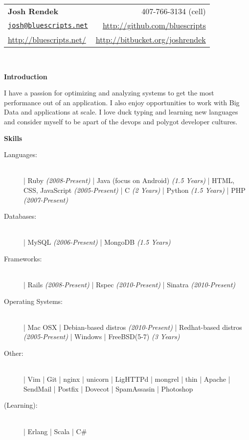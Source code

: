 \documentclass[letterpaper,11pt]{article}
\newcommand{\resheading}[1]{{\large \colorbox{myblue}{\begin{minipage}{\textwidth}{\textbf{#1 \vphantom{p\^{E}}}}\end{minipage}}}}
\begin{document}
\newcommand{\infoheader}{
\begin{tabular*}{7.5in}{l@{\extracolsep{\fill}}r}
\textbf{\LARGE Josh Rendek }  & 407-766-3134 (cell) \\ 
\href{mailto:josh@bluescripts.net}{\nolinkurl{josh@bluescripts.net}} & \url{http://github.com/bluescripts} \\
\url{http://bluescripts.net/} & \url{http://bitbucket.org/joshrendek} \\
\end{tabular*}
\\

\vspace{0.1in}
}

\newcommand{\pagebreakwithheader}{\pagebreak\infoheader}

\infoheader

\resheading{Introduction}
I have a passion for optimizing and analyzing systems to get the most performance out of an application. I also enjoy opportunities to work with Big Data and applications at scale. I love duck typing and learning new languages and consider myself to be apart of the devops and polygot developer cultures.
\linebreak

\resheading{Skills}

\begin{description}
    \item[Languages:] \hfill \\
        | Ruby \textit{(2008-Present)} 
        | Java (focus on Android) \textit{(1.5 Years)} 
        | HTML, CSS, JavaScript \textit{(2005-Present)} 
        | C \textit{(2 Years)} 
        | Python \textit{(1.5 Years)} 
        | PHP \textit{(2007-Present)}
    \item[Databases:] \hfill  \\
        | MySQL \textit{(2006-Present)} 
        | MongoDB \textit{(1.5 Years)}
    \item[Frameworks:] \hfill \\
        | Rails \textit{(2008-Present)} 
        | Rspec \textit{(2010-Present)}    
        | Sinatra \textit{(2010-Present)} 
    \item[Operating Systems:] \hfill \\
        | Mac OSX   
        | Debian-based distros \textit{(2010-Present)}
        | Redhat-based distros \textit{(2005-Present)}
        | Windows   
        | FreeBSD(5-7) \textit{(3 Years)}
    \item[Other:] \hfill \\
        | Vim       
        | Git       
        | nginx     
        | unicorn   
        | LigHTTPd  
        | mongrel   
        | thin      
        | Apache   
        | SendMail
        | Postfix  
        | Dovecot 
        | SpamAssasin 
        | Photoshop 
    \item[(Learning):] \hfill \\
        | Erlang 
        | Scala 
        | C\#
\end{description}
\end{document}
